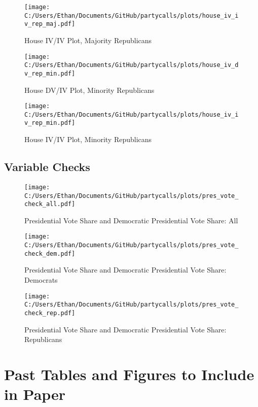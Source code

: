 \documentclass[12pt]{article}
\begin{document}
\begin{figure}[H]
	\centering
	\caption{House IV/IV Plot, Majority Republicans}
	\texttt{[image: C:/Users/Ethan/Documents/GitHub/partycalls/plots/house\_iv\_iv\_rep\_maj.pdf]}
\end{figure}


\begin{figure}[H]
	\centering
	\caption{House DV/IV Plot, Minority Republicans}
	\texttt{[image: C:/Users/Ethan/Documents/GitHub/partycalls/plots/house\_iv\_dv\_rep\_min.pdf]}
\end{figure}

\begin{figure}[H]
	\centering
	\caption{House IV/IV Plot, Minority Republicans}
	\texttt{[image: C:/Users/Ethan/Documents/GitHub/partycalls/plots/house\_iv\_iv\_rep\_min.pdf]}
\end{figure}

\clearpage

\subsection{Variable Checks}

\begin{figure}[H]
\centering
\caption{Presidential Vote Share and Democratic Presidential Vote Share: All}
\texttt{[image: C:/Users/Ethan/Documents/GitHub/partycalls/plots/pres\_vote\_check\_all.pdf]}
\end{figure}

\begin{figure}[H]
	\centering
	\caption{Presidential Vote Share and Democratic Presidential Vote Share: Democrats}
	\texttt{[image: C:/Users/Ethan/Documents/GitHub/partycalls/plots/pres\_vote\_check\_dem.pdf]}
\end{figure}

\begin{figure}[H]
	\centering
	\caption{Presidential Vote Share and Democratic Presidential Vote Share: Republicans}
	\texttt{[image: C:/Users/Ethan/Documents/GitHub/partycalls/plots/pres\_vote\_check\_rep.pdf]}
\end{figure}

\clearpage

\section{Past Tables and Figures to Include in Paper}
\end{document}
